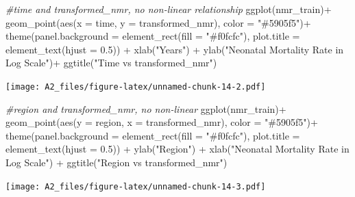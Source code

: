 \documentclass[
]{article}
\newenvironment{Shaded}{\begin{snugshade}}{\end{snugshade}}
\newcommand{\AttributeTok}[1]{\textcolor[rgb]{0.77,0.63,0.00}{#1}}
\newcommand{\CommentTok}[1]{\textcolor[rgb]{0.56,0.35,0.01}{\textit{#1}}}
\newcommand{\FloatTok}[1]{\textcolor[rgb]{0.00,0.00,0.81}{#1}}
\newcommand{\FunctionTok}[1]{\textcolor[rgb]{0.00,0.00,0.00}{#1}}
\newcommand{\NormalTok}[1]{#1}
\newcommand{\SpecialCharTok}[1]{\textcolor[rgb]{0.00,0.00,0.00}{#1}}
\newcommand{\StringTok}[1]{\textcolor[rgb]{0.31,0.60,0.02}{#1}}
\begin{document}
\begin{Shaded}
\begin{Highlighting}[]
\CommentTok{\#time and transformed\_nmr, no non{-}linear relationship}
\FunctionTok{ggplot}\NormalTok{(nmr\_train)}\SpecialCharTok{+}
  \FunctionTok{geom\_point}\NormalTok{(}\FunctionTok{aes}\NormalTok{(}\AttributeTok{x =}\NormalTok{ time, }\AttributeTok{y =}\NormalTok{ transformed\_nmr), }\AttributeTok{color =} \StringTok{"\#5905f5"}\NormalTok{)}\SpecialCharTok{+}
  \FunctionTok{theme}\NormalTok{(}\AttributeTok{panel.background =} \FunctionTok{element\_rect}\NormalTok{(}\AttributeTok{fill =} \StringTok{"\#f0fcfc"}\NormalTok{),}
        \AttributeTok{plot.title =} \FunctionTok{element\_text}\NormalTok{(}\AttributeTok{hjust =} \FloatTok{0.5}\NormalTok{)) }\SpecialCharTok{+}
  \FunctionTok{xlab}\NormalTok{(}\StringTok{"Years"}\NormalTok{) }\SpecialCharTok{+}
  \FunctionTok{ylab}\NormalTok{(}\StringTok{"Neonatal Mortality Rate in Log Scale"}\NormalTok{)}\SpecialCharTok{+}
  \FunctionTok{ggtitle}\NormalTok{(}\StringTok{"Time vs transformed\_nmr"}\NormalTok{)}
\end{Highlighting}
\end{Shaded}

\texttt{[image: A2\_files/figure-latex/unnamed-chunk-14-2.pdf]}

\begin{Shaded}
\begin{Highlighting}[]
\CommentTok{\#region and transformed\_nmr, no non{-}linear}
\FunctionTok{ggplot}\NormalTok{(nmr\_train)}\SpecialCharTok{+}
  \FunctionTok{geom\_point}\NormalTok{(}\FunctionTok{aes}\NormalTok{(}\AttributeTok{y =}\NormalTok{ region, }\AttributeTok{x =}\NormalTok{ transformed\_nmr), }\AttributeTok{color =} \StringTok{"\#5905f5"}\NormalTok{)}\SpecialCharTok{+}
  \FunctionTok{theme}\NormalTok{(}\AttributeTok{panel.background =} \FunctionTok{element\_rect}\NormalTok{(}\AttributeTok{fill =} \StringTok{"\#f0fcfc"}\NormalTok{),}
        \AttributeTok{plot.title =} \FunctionTok{element\_text}\NormalTok{(}\AttributeTok{hjust =} \FloatTok{0.5}\NormalTok{)) }\SpecialCharTok{+}
  \FunctionTok{ylab}\NormalTok{(}\StringTok{"Region"}\NormalTok{) }\SpecialCharTok{+}
  \FunctionTok{xlab}\NormalTok{(}\StringTok{"Neonatal Mortality Rate in Log Scale"}\NormalTok{) }\SpecialCharTok{+}
  \FunctionTok{ggtitle}\NormalTok{(}\StringTok{"Region vs transformed\_nmr"}\NormalTok{)}
\end{Highlighting}
\end{Shaded}

\texttt{[image: A2\_files/figure-latex/unnamed-chunk-14-3.pdf]}
\end{document}
